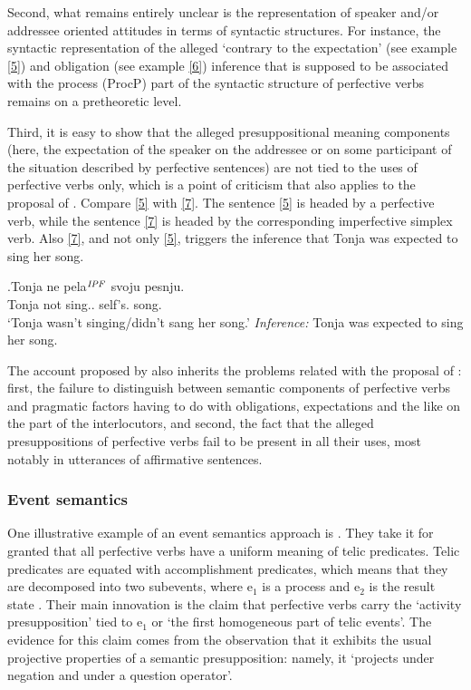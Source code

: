  Second, what remains entirely unclear is the representation of speaker and/or addressee oriented attitudes in terms of syntactic structures. For instance, the syntactic representation of the alleged `contrary to the expectation' (see example \ref{5}) and obligation (see example \ref{6}) inference that is supposed to be associated with the process (ProcP) part of the syntactic structure of perfective verbs remains on a pretheoretic level.

 Third, it is easy to show that the alleged presuppositional meaning components (here, the expectation of the speaker on the addressee or on some participant of the situation described by perfective sentences) are not tied to the uses of perfective verbs only, which is a point of criticism that also applies to the proposal of \citet{Paducheva:96}. Compare \ref{5} with \ref{7}. The sentence \ref{5} is headed by a perfective verb, while the sentence \ref{7} is headed by the corresponding imperfective simplex verb. Also \ref{7}, and not only \ref{5}, triggers the inference that Tonja was expected to sing her song.

\exg.\label{7}Tonja ne pela$^{\mathit{IPF}}$ svoju pesnju.\\
 Tonja not sing.. self's. song.\\
 \vspace{0.5em}
`Tonja wasn't singing/didn't sang her song.'
\textit{Inference:} Tonja was expected to sing her song.

The account proposed by \citet{Romanova:06} also inherits the problems related with the proposal of \citet{Paducheva:96}: first, the failure to distinguish between semantic components of perfective verbs and pragmatic factors having to do with obligations, expectations and the like on the part of the interlocutors, and second, the fact that the alleged presuppositions of perfective verbs fail to be present in all their uses, most notably in utterances of affirmative sentences. 

\subsubsection{Event semantics}
One illustrative example of an event semantics approach is \citet{Docekal:09}. They take it for granted that all perfective verbs have a uniform meaning of telic predicates. Telic predicates are equated with accomplishment predicates, which means that they are decomposed into two subevents, where e$_1$ is a process and e$_2$ is the result state \citep[mainly following][]{Giorgi:01}. Their main innovation is the claim that perfective verbs carry the `activity presupposition' tied to e$_1$ or `the first homogeneous part of telic events'. The evidence for this claim comes from the observation that it exhibits the usual projective properties of a semantic presupposition: namely, it `projects under negation and under a question operator'.


